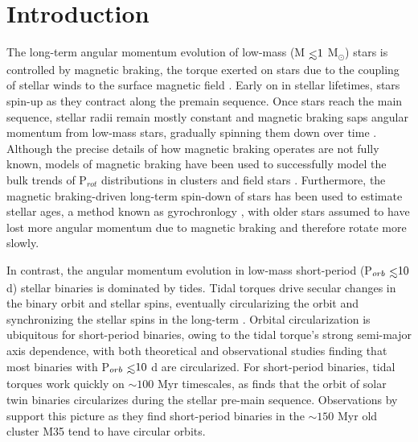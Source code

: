 \documentclass[twocolumn]{aastex61}
\def\lsim{~\rlap{$<$}{\lower 1.0ex\hbox{$\sim$}}}
\newcommand{\kepler}[0]{\textit{Kepler}\xspace}
\begin{document}
\begin{abstract}
\end{abstract}




\section{Introduction} \label{sec:intro}

The long-term angular momentum evolution of low-mass (M$\lsim 1$ M$_{\odot}$) stars is controlled by magnetic braking, the torque exerted on stars due to the coupling of stellar winds to the surface magnetic field \citep{Dunn1961,Mestel1968}. Early on in stellar lifetimes, stars spin-up as they contract along the premain sequence.  Once stars reach the main sequence, stellar radii remain mostly constant and magnetic braking saps angular momentum from low-mass stars, gradually spinning them down over time \citep{Skumanich1972}. Although the precise details of how magnetic braking operates are not fully known, models of magnetic braking have been used to successfully model the bulk trends of P$_{rot}$ distributions in clusters \citep[e.g. Praesepe, ][]{Matt2015,Douglas2017} and field stars \citep[e.g. \kepler, ][]{Reiners2012,Matt2015,vanSaders2018}. Furthermore, the magnetic braking-driven long-term spin-down of stars has been used to estimate stellar ages, a method known as gyrochronlogy \citep{Skumanich1972,Barnes2003,Barnes2007,Mamajek2008,Barnes2010}, with older stars assumed to have lost more angular momentum due to magnetic braking and therefore rotate more slowly.

In contrast, the angular momentum evolution in low-mass short-period (P$_{orb} \lsim 10$ d) stellar binaries is dominated by tides.  Tidal torques drive secular changes in the binary orbit and stellar spins, eventually circularizing the orbit and synchronizing the stellar spins in the long-term \citep{Counselman1973}. Orbital circularization is ubiquitous for short-period binaries, owing to the tidal torque's strong semi-major axis dependence, with both theoretical \citep[e.g.][]{Zahn1989,Claret1995} and observational \citep[e.g.][]{Meibom2005,Mazeh2008,Lurie2017} studies finding that most binaries with P$_{orb} \lsim 10$ d are circularized. For short-period binaries, tidal torques work quickly on ${\sim}100$ Myr timescales, as \citet{Zahn1989} finds that the orbit of solar twin binaries circularizes during the stellar pre-main sequence.  Observations by \citet{Meibom2005} support this picture as they find short-period binaries in the ${\sim}150$ Myr old cluster M35 tend to have circular orbits.
\end{document}
